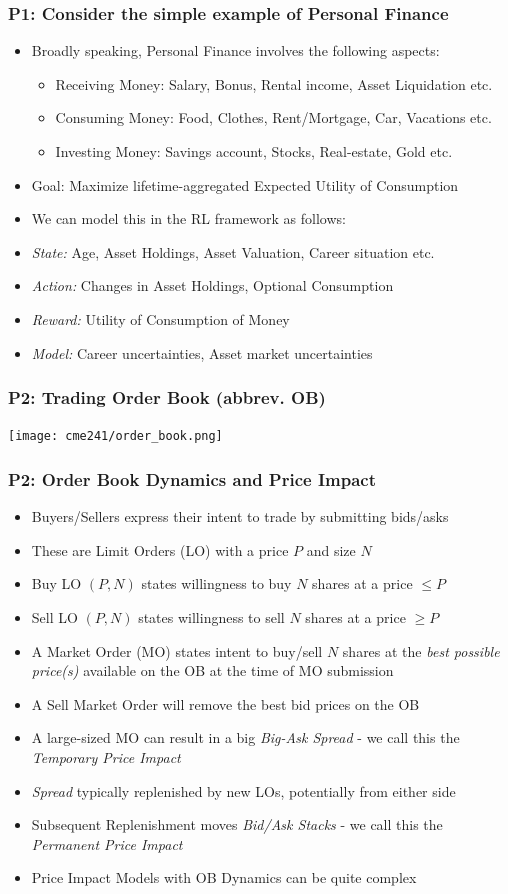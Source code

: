\documentclass[handout]{beamer}
\begin{document}
\begin{frame}
\frametitle{P1: Consider the simple example of Personal Finance}
\pause
\begin{itemize}[<+->]
\item Broadly speaking, Personal Finance involves the following aspects:
\pause
\begin{itemize}[<+->]
\item Receiving Money: Salary, Bonus, Rental income, Asset Liquidation etc.
\item Consuming Money: Food, Clothes, Rent/Mortgage, Car, Vacations etc.
\item Investing Money: Savings account, Stocks, Real-estate, Gold etc.
\end{itemize}
\item Goal: Maximize lifetime-aggregated Expected Utility of Consumption
\item We can model this in the RL framework as follows:
\item {\em State:} Age, Asset Holdings, Asset Valuation, Career situation etc.
\item {\em Action:} Changes in Asset Holdings, Optional Consumption
\item {\em Reward:} Utility of Consumption of Money
\item {\em Model:} Career uncertainties, Asset market uncertainties
\end{itemize}
\end{frame}


\begin{frame}
\frametitle{P2: Trading Order Book (abbrev. OB)}
\texttt{[image: cme241/order\_book.png]}
\end{frame}

\begin{frame}
\frametitle{P2: Order Book Dynamics and Price Impact}
\pause
\begin{itemize}[<+->]
\item Buyers/Sellers express their intent to trade by submitting bids/asks
\item These are Limit Orders (LO) with a price $P$ and size $N$
\item Buy LO $(P, N)$ states willingness to buy $N$ shares at a price $\leq P$
\item Sell  LO $(P, N)$ states willingness to sell $N$ shares at a price $\geq P$
\item A Market Order (MO) states intent to buy/sell $N$ shares at the {\em best possible price(s)} available on the OB at the time of MO submission
\item A Sell Market Order will remove the best bid prices on the OB
\item A large-sized MO can result in a big {\em Big-Ask Spread} - we call this the {\em Temporary Price Impact}
\item {\em Spread} typically replenished by new LOs, potentially from either side
\item Subsequent Replenishment moves {\em Bid/Ask Stacks} - we call this the {\em Permanent Price Impact}
\item Price Impact Models with OB Dynamics can be quite complex
\end{itemize}
\end{frame}
\end{document}

